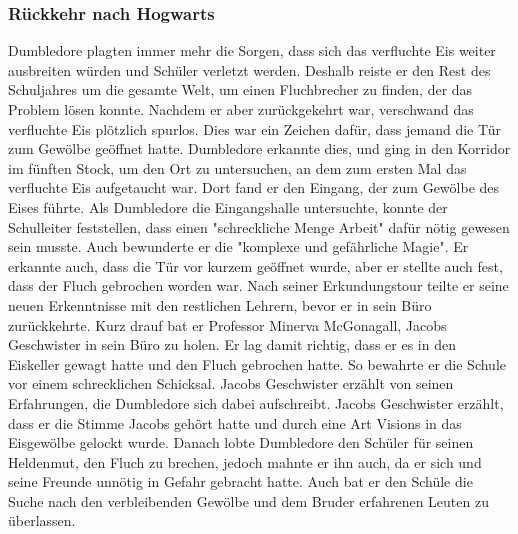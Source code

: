 \documentclass[a4paper, 10pt]{article}
\begin{document}
\subsubsection*{Rückkehr nach Hogwarts}
Dumbledore plagten immer mehr die Sorgen, dass sich das verfluchte Eis weiter ausbreiten würden und Schüler verletzt werden. Deshalb reiste er den Rest des Schuljahres um die gesamte Welt, um einen Fluchbrecher zu finden, der das Problem lösen konnte. Nachdem er aber zurückgekehrt war, verschwand das verfluchte Eis plötzlich spurlos. Dies war ein Zeichen dafür, dass jemand die Tür zum Gewölbe geöffnet hatte. Dumbledore erkannte dies, und ging in den Korridor im fünften Stock, um den Ort zu untersuchen, an dem zum ersten Mal das verfluchte Eis aufgetaucht war. Dort fand er den Eingang, der zum Gewölbe des Eises führte. Als Dumbledore die Eingangshalle untersuchte, konnte der Schulleiter feststellen, dass einen "schreckliche Menge Arbeit" dafür nötig gewesen sein musste. Auch bewunderte er die "komplexe und gefährliche Magie". Er erkannte auch, dass die Tür vor kurzem geöffnet wurde, aber er stellte auch fest, dass der Fluch gebrochen worden war.
\vspace{10pt}
\newline
{}  
Nach seiner Erkundungstour teilte er seine neuen Erkenntnisse mit den restlichen Lehrern, bevor er in sein Büro zurückkehrte. Kurz drauf bat er Professor Minerva McGonagall, Jacobs Geschwister in sein Büro zu holen. Er lag damit richtig, dass er es in den Eiskeller gewagt hatte und den Fluch gebrochen hatte. So bewahrte er die Schule vor einem schrecklichen Schicksal. Jacobs Geschwister erzählt von seinen Erfahrungen, die Dumbledore sich dabei aufschreibt. Jacobs Geschwister erzählt, dass er die Stimme Jacobs gehört hatte und durch eine Art Visions in das Eisgewölbe gelockt wurde. Danach lobte Dumbledore den Schüler für seinen Heldenmut, den Fluch zu brechen, jedoch mahnte er ihn auch, da er sich und seine Freunde unnötig in Gefahr gebracht hatte. Auch bat er den Schüle die Suche nach den verbleibenden Gewölbe und dem Bruder erfahrenen Leuten zu überlassen.
\end{document}
